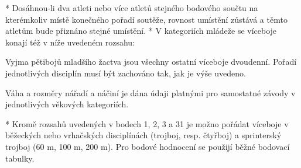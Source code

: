 * Dosáhnou-li dva atleti nebo více atletů stejného bodového součtu na kterémkoliv místě konečného pořadí soutěže, rovnost umístění zůstává a těmto atletům bude přiznáno stejné umístění.
* V kategoriích mládeže se víceboje konají též v níže uvedeném rozsahu:


Vyjma pětibojů mladšího žactva jsou všechny ostatní víceboje dvoudenní. Pořadí jednotlivých disciplín musí být zachováno tak, jak je výše uvedeno.

Váha a rozměry nářadí a náčiní je dána údaji platnými pro samostatné závody v jednotlivých věkových kategoriích.

* Kromě rozsahů uvedených v bodech 1, 2, 3 a 31 je možno pořádat víceboje v běžeckých nebo vrhačských disciplínách (trojboj, resp. čtyřboj) a sprinterský trojboj (60 m, 100 m, 200 m). Pro bodové hodnocení se použijí běžné bodovací tabulky.
\enditems

\endinput